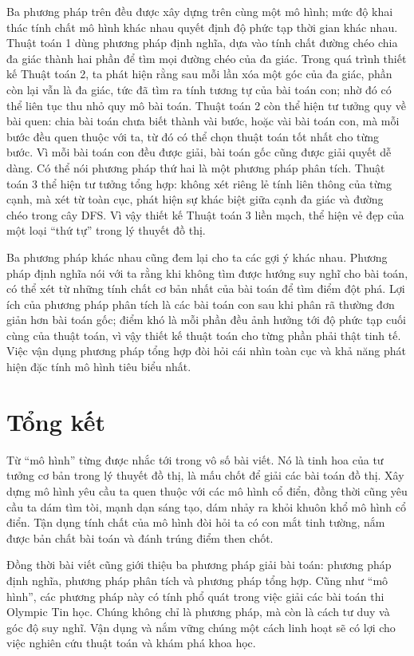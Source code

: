 \documentclass[11pt]{article}
\begin{document}
Ba phương pháp trên đều được xây dựng trên cùng một mô hình; mức độ khai thác
tính chất mô hình khác nhau quyết định độ phức tạp thời gian khác nhau. Thuật
toán 1 dùng phương pháp định nghĩa, dựa vào tính chất đường chéo chia đa giác
thành hai phần để tìm mọi đường chéo của đa giác. Trong quá trình thiết kế
Thuật toán 2, ta phát hiện rằng sau mỗi lần xóa một góc của đa giác, phần còn
lại vẫn là đa giác, tức đã tìm ra tính tương tự của bài toán con; nhờ đó có thể
liên tục thu nhỏ quy mô bài toán. Thuật toán 2 còn thể hiện tư tưởng quy về
bài quen: chia bài toán chưa biết thành vài bước, hoặc vài bài toán con, mà mỗi
bước đều quen thuộc với ta, từ đó có thể chọn thuật toán tốt nhất cho từng
bước. Vì mỗi bài toán con đều được giải, bài toán gốc cũng được giải quyết dễ
dàng. Có thể nói phương pháp thứ hai là một phương pháp phân tích. Thuật toán
3 thể hiện tư tưởng tổng hợp: không xét riêng lẻ tính liên thông của từng
cạnh, mà xét từ toàn cục, phát hiện sự khác biệt giữa cạnh đa giác và đường
chéo trong cây DFS. Vì vậy thiết kế Thuật toán 3 liền mạch, thể hiện vẻ đẹp
của một loại ``thứ tự'' trong lý thuyết đồ thị.

Ba phương pháp khác nhau cũng đem lại cho ta các gợi ý khác nhau. Phương pháp
định nghĩa nói với ta rằng khi không tìm được hướng suy nghĩ cho bài toán, có
thể xét từ những tính chất cơ bản nhất của bài toán để tìm điểm đột phá. Lợi
ích của phương pháp phân tích là các bài toán con sau khi phân rã thường đơn
giản hơn bài toán gốc; điểm khó là mỗi phần đều ảnh hưởng tới độ phức tạp cuối
cùng của thuật toán, vì vậy thiết kế thuật toán cho từng phần phải thật tinh
tế. Việc vận dụng phương pháp tổng hợp đòi hỏi cái nhìn toàn cục và khả năng
phát hiện đặc tính mô hình tiêu biểu nhất.

\section{Tổng kết}

Từ ``mô hình'' từng được nhắc tới trong vô số bài viết. Nó là tinh hoa của tư
tưởng cơ bản trong lý thuyết đồ thị, là mấu chốt để giải các bài toán đồ thị.
Xây dựng mô hình yêu cầu ta quen thuộc với các mô hình cổ điển, đồng thời cũng
yêu cầu ta dám tìm tòi, mạnh dạn sáng tạo, dám nhảy ra khỏi khuôn khổ mô hình
cổ điển. Tận dụng tính chất của mô hình đòi hỏi ta có con mắt tinh tường, nắm
được bản chất bài toán và đánh trúng điểm then chốt.

Đồng thời bài viết cũng giới thiệu ba phương pháp giải bài toán: phương pháp
định nghĩa, phương pháp phân tích và phương pháp tổng hợp. Cũng như ``mô
hình'', các phương pháp này có tính phổ quát trong việc giải các bài toán thi
Olympic Tin học. Chúng không chỉ là phương pháp, mà còn là cách tư duy và góc
độ suy nghĩ. Vận dụng và nắm vững chúng một cách linh hoạt sẽ có lợi cho việc
nghiên cứu thuật toán và khám phá khoa học.
\end{document}
